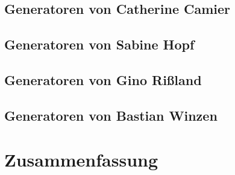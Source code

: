 \documentclass{article}
\begin{document}
		\subsection{Generatoren von Catherine Camier}
			
			\clearpage
		\subsection{Generatoren von Sabine Hopf}
			
			\clearpage
		\subsection{Generatoren von Gino Rißland}
			
			\clearpage
		\subsection{Generatoren von Bastian Winzen}
			
		
	\section{Zusammenfassung}
	

\clearpage


\end{document}
